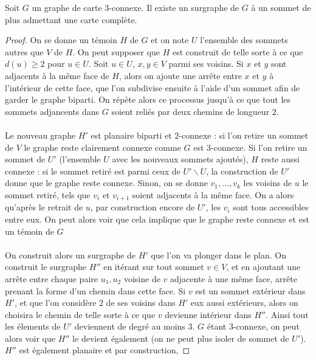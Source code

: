 \documentclass{scrartcl}
\begin{document}
\begin{flushleft}
\begin{lem}\label{3connCompl}
    Soit $G$ un graphe de carte $3$-connexe. Il existe un surgraphe de $G$ à un sommet de plus admettant une carte complète.
\end{lem}

\begin{proof}
    On se donne un témoin $H$ de $G$ et on note $U$ l'ensemble des sommets autres que $V$ de $H$. On peut supposer que $H$
    est construit de telle sorte à ce que $d(u) \geq 2$ pour $u \in U$. Soit $u \in U$, $x, y \in V$ parmi ses voisins.
    Si $x$ et $y$ sont adjacents à la même face de $H$, alors on ajoute une arrête entre $x$ et $y$ à l'intérieur de cette face,
    que l'on subdivise ensuite à l'aide d'un sommet afin de garder le graphe biparti. On répète alors
    ce processus jusqu'à ce que tout les sommets adjancents dans $G$ soient reliés par deux chemins de longueur $2$.
    \\~\\
    Le nouveau graphe $H'$ est planaire biparti et $2$-connexe : si l'on retire un sommet de $V$ le graphe reste clairement
    connexe comme $G$ est $3$-connexe. Si l'on retire un sommet de $U'$ (l'ensemble $U$ avec les nouveaux sommets ajoutés),
    $H$ reste aussi connexe :
    si le sommet retiré est parmi ceux de $U' \backslash U$, la construction de $U'$ donne que le graphe reste connexe. Sinon,
    on se donne $v_1, ..., v_k$ les voisins de $u$ le sommet retiré, tels que $v_i$ et $v_{i+1}$ soient adjacents à la
    même face. On a alors qu'après le retrait de $u$, par construction encore de $U'$, les $v_i$ sont tous accessibles
    entre eux. On peut alors voir que cela implique que le graphe reste connexe et est un témoin de $G$
    \\~\\
    On construit alors un surgraphe de $H'$ que l'on va plonger dans le plan. On construit le
    surgraphe $H''$ en itérant sur tout sommet $v \in V$, et en ajoutant une arrête entre chaque paire $u_1, u_2$
    voisine de $v$ adjacente à une même face, arrête prenant la forme d'un chemin dans cette face. Si $v$ est
    un sommet extérieur dans $H'$, et que l'on considère $2$ de ses voisins dans $H'$ eux aussi extérieurs,
    alors on choisira le chemin de telle sorte à ce que $v$ devienne intérieur dans $H''$.
    Ainsi tout les élements de $U'$ deviennent de degré au moins $3$. $G$ étant $3$-connexe, on peut alors voir que $H''$
    le devient également (on ne peut plus isoler de sommet de $U'$). $H''$ est également planaire et par construction,

\end{proof}
\end{flushleft}
\end{document}
